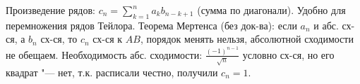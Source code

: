 Произведение рядов: $c_n = \sum_{k=1}^n a_k b_{n-k+1}$ (сумма по диагонали).
Удобно для перемножения рядов Тейлора.
Теорема Мертенса (без док-ва): если $a_n$ и абс. сх-ся, а $b_n$ сх-ся, то $c_n$ сх-ся к $AB$, порядок менять нельзя, абсолютной сходимости не обещаем.
Необходимость абс. сходимости: $\frac{(-1)^{n-1}}{\sqrt n}$ условно сх-ся, но его квадрат "--- нет, т.к. расписали честно, получили $c_n=1$.

